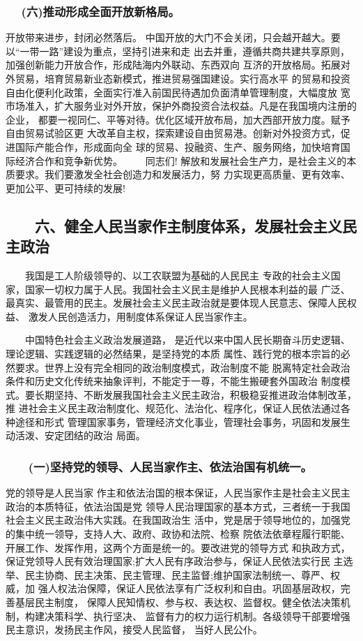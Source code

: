 \documentclass[11pt]{ctexart}
\begin{document}
{{{{\subsubsection{　 (六)推动形成全面开放新格局。}
\label{sec:org267dfcf}

开放带来进步，封闭必然落后。
中国开放的大门不会关闭，只会越开越大。要以“一带一路”建设为重点，坚持引进来和走
出去并重，遵循共商共建共享原则，加强创新能力开放合作，形成陆海内外联动、东西双向
互济的开放格局。拓展对外贸易，培育贸易新业态新模式，推进贸易强国建设。实行高水平
的贸易和投资自由化便利化政策，全面实行准入前国民待遇加负面清单管理制度，大幅度放
宽市场准入，扩大服务业对外开放，保护外商投资合法权益。凡是在我国境内注册的企业，
都要一视同仁、平等对待。优化区域开放布局，加大西部开放力度。赋予自由贸易试验区更
大改革自主权，探索建设自由贸易港。创新对外投资方式，促进国际产能合作，形成面向全
球的贸易、投融资、生产、服务网络，加快培育国际经济合作和竞争新优势。 　　同志们!
解放和发展社会生产力，是社会主义的本质要求。我们要激发全社会创造力和发展活力，努
力实现更高质量、更有效率、更加公平、更可持续的发展!

\subsection{　　六、健全人民当家作主制度体系，发展社会主义民主政治}
\label{sec:org5456af0}

　　我国是工人阶级领导的、以工农联盟为基础的人民民主
专政的社会主义国家，国家一切权力属于人民。我国社会主义民主是维护人民根本利益的最
广泛、最真实、最管用的民主。发展社会主义民主政治就是要体现人民意志、保障人民权益、
激发人民创造活力，用制度体系保证人民当家作主。

　　中国特色社会主义政治发展道路，
是近代以来中国人民长期奋斗历史逻辑、理论逻辑、实践逻辑的必然结果，是坚持党的本质
属性、践行党的根本宗旨的必然要求。世界上没有完全相同的政治制度模式，政治制度不能
脱离特定社会政治条件和历史文化传统来抽象评判，不能定于一尊，不能生搬硬套外国政治
制度模式。要长期坚持、不断发展我国社会主义民主政治，积极稳妥推进政治体制改革，推
进社会主义民主政治制度化、规范化、法治化、程序化，保证人民依法通过各种途径和形式
管理国家事务，管理经济文化事业，管理社会事务，巩固和发展生动活泼、安定团结的政治
局面。

\subsubsection{　　(一)坚持党的领导、人民当家作主、依法治国有机统一。}
\label{sec:org0fc857c}

党的领导是人民当家
作主和依法治国的根本保证，人民当家作主是社会主义民主政治的本质特征，依法治国是党
领导人民治理国家的基本方式，三者统一于我国社会主义民主政治伟大实践。在我国政治生
活中，党是居于领导地位的，加强党的集中统一领导，支持人大、政府、政协和法院、检察
院依法依章程履行职能、开展工作、发挥作用，这两个方面是统一的。要改进党的领导方式
和执政方式，保证党领导人民有效治理国家;扩大人民有序政治参与，保证人民依法实行民
主选举、民主协商、民主决策、民主管理、民主监督;维护国家法制统一、尊严、权威，加
强人权法治保障，保证人民依法享有广泛权利和自由。巩固基层政权，完善基层民主制度，
保障人民知情权、参与权、表达权、监督权。健全依法决策机制，构建决策科学、执行坚决、
监督有力的权力运行机制。各级领导干部要增强民主意识，发扬民主作风，接受人民监督，
当好人民公仆。

}}}}
\end{document}
